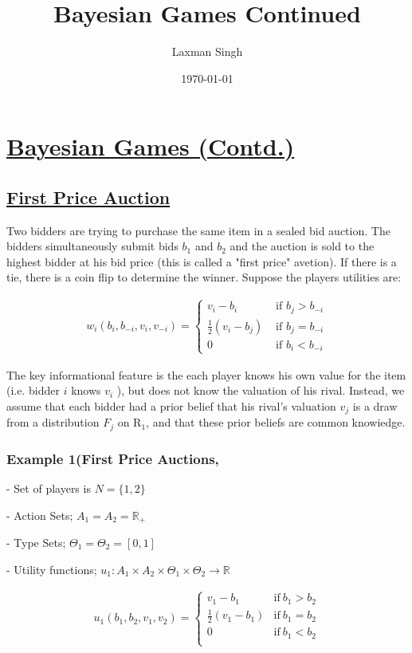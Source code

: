 \documentclass[12pt,a4paper]{article}
\author{Laxman Singh}
\date{\today}
\title{Bayesian Games Continued}
\begin{document}
 \section*{\underline{Bayesian Games (Contd.)}}
   \subsection*{  \underline{ First Price Auction } } 

 Two bidders are trying to purchase the same item in a sealed bid auction. The bidders simultaneously submit bids \(b_1\) and \(b_2\) and the auction is sold to the highest bidder at his bid price (this is called a "first price" avetion). If there is a tie, there is a coin flip to determine the winner. Suppose the players utilities are:
 
 \begin{align*}
 w_i\left(b_i, b_{-i}, v_i, v_{-i}\right)= \begin{cases}v_i-b_i & \text { if } b_j>b_{-i} \\ \frac{1}{2}\left(v_i-b_j\right) & \text { if } b_j=b_{-i} \\ 0 & \text { if } b_i<b_{-i}\end{cases}
 \end{align*}
 
 
 The key informational feature is the each player knows his own value for the item (i.e. bidder \(i\) knows \(v_i\) ), but does not know the valuation of his rival. Instead, we assume that each bidder had a prior belief that his rival's valuation \(v_j\) is a draw from a distribution \(F_j\) on \(\mathrm{R}_1\), and that these prior beliefs are common knowiedge.
 
  \subsubsection*{ Example 1(First Price Auctions, } 
  - Set of players is \(N=\{1,2\}\)
  
  - Action Sets; \(A_{1}=A_{2}=\mathbb{R}_{+}\)
  
  - Type Sets; \(\Theta_{1}=\Theta_{2}=[0,1]\)
  
  - Utility functions; \(u_{1}:A_{1} \times A_{2} \times \Theta_{1} \times \Theta_{2} \to \mathbb{R}\) 
  
   \begin{align*}
      u_{1}(b_{1},b_{2},v_{1},v_{2})=
      \begin{cases}
        v_{1}-b_{1} & \text{if} \ b_{1}>b_{2} \\
        \frac{1}{2}(v_{1}-b_{1}) & \text{if} \ b_{1}=b_{2}\\
        0 & \text{if} \ b_{1}<b_{2}\\
      \end{cases}
  \end{align*}
\end{document}
